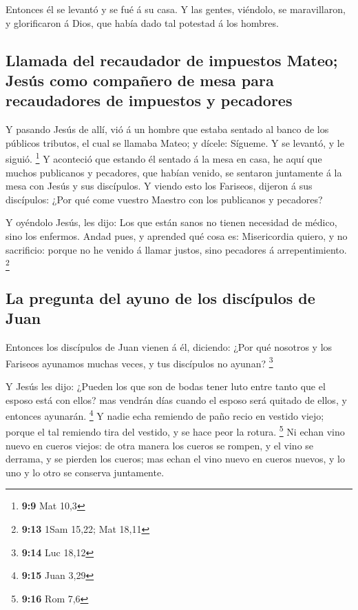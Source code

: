  Entonces él se levantó y se fué á su casa.  Y
las gentes, viéndolo, se maravillaron, y glorificaron á Dios, que había
dado tal potestad á los hombres.

\hypertarget{llamada-del-recaudador-de-impuestos-mateo-jesuxfas-como-compauxf1ero-de-mesa-para-recaudadores-de-impuestos-y-pecadores}{%
\subsection{Llamada del recaudador de impuestos Mateo; Jesús como
compañero de mesa para recaudadores de impuestos y
pecadores}\label{llamada-del-recaudador-de-impuestos-mateo-jesuxfas-como-compauxf1ero-de-mesa-para-recaudadores-de-impuestos-y-pecadores}}

 Y pasando Jesús de allí, vió á un hombre que estaba sentado
al banco de los públicos tributos, el cual se llamaba Mateo; y dícele:
Sígueme. Y se levantó, y le siguió. \footnote{\textbf{9:9} Mat 10,3}
 Y aconteció que estando él sentado á la mesa en casa, he
aquí que muchos publicanos y pecadores, que habían venido, se sentaron
juntamente á la mesa con Jesús y sus discípulos.  Y viendo
esto los Fariseos, dijeron á sus discípulos: ¿Por qué come vuestro
Maestro con los publicanos y pecadores?

 Y oyéndolo Jesús, les dijo: Los que están sanos no tienen
necesidad de médico, sino los enfermos.  Andad pues, y
aprended qué cosa es: Misericordia quiero, y no sacrificio: porque no he
venido á llamar justos, sino pecadores á arrepentimiento. \footnote{\textbf{9:13}
  1Sam 15,22; Mat 18,11}

\hypertarget{la-pregunta-del-ayuno-de-los-discuxedpulos-de-juan}{%
\subsection{La pregunta del ayuno de los discípulos de
Juan}\label{la-pregunta-del-ayuno-de-los-discuxedpulos-de-juan}}

 Entonces los discípulos de Juan vienen á él, diciendo:
¿Por qué nosotros y los Fariseos ayunamos muchas veces, y tus discípulos
no ayunan? \footnote{\textbf{9:14} Luc 18,12}

 Y Jesús les dijo: ¿Pueden los que son de bodas tener luto
entre tanto que el esposo está con ellos? mas vendrán días cuando el
esposo será quitado de ellos, y entonces ayunarán. \footnote{\textbf{9:15}
  Juan 3,29}  Y nadie echa remiendo de paño recio en
vestido viejo; porque el tal remiendo tira del vestido, y se hace peor
la rotura. \footnote{\textbf{9:16} Rom 7,6}  Ni echan vino
nuevo en cueros viejos: de otra manera los cueros se rompen, y el vino
se derrama, y se pierden los cueros; mas echan el vino nuevo en cueros
nuevos, y lo uno y lo otro se conserva juntamente.

